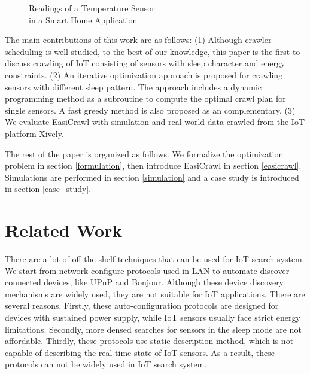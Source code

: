 \documentclass[conference]{IEEEtran}
\begin{document}
\begin{figure}
	\centering
	\hspace{-3.0em}
	
	\captionsetup{justification=centering}
	\caption{Readings of a Temperature Sensor\\ in a Smart Home Application}
	\vspace{-1.0em}
	\label{fig:smarthome}
\end{figure}

The main contributions of this work are as follows:
(1) Although crawler scheduling is well studied, to the best of our knowledge, this paper is the first to discuss crawling of IoT consisting of sensors with sleep character and energy constraints.
(2) An iterative optimization approach is proposed for crawling sensors with different sleep pattern. 
The approach includes a dynamic programming method as a subroutine to compute the optimal crawl plan for single sensors. 
A fast greedy method is also proposed as an complementary.
(3) We evaluate EasiCrawl with simulation and real world data crawled from the IoT platform Xively\cite{xively}.

The rest of the paper is organized as follows. 
We formalize the optimization problem in section \ref{formulation}, then introduce EasiCrawl in section \ref{easicrawl}. 
Simulations are performed in section \ref{simulation} and a case study is introduced in section \ref{case_study}. 

\section{Related Work}\label{related_work}

There are a lot of off-the-shelf techniques that can be used for IoT search system.
We start from network configure protocols used in LAN to automate discover connected devices, like UPnP\cite{UPnP} and Bonjour\cite{Bonjour}.
Although these device discovery mechanisms are widely used, they are not suitable for IoT applications. There are several reasons. 
Firstly, these auto-configuration protocols are designed for devices with sustained power supply, while IoT sensors usually face strict energy limitations.
Secondly, more densed searches for sensors in the sleep mode are not affordable.
Thirdly, these protocols use static description method, which is not capable of describing the real-time state of IoT sensors.
As a result, these protocols can not be widely used in IoT search system.
\end{document}
